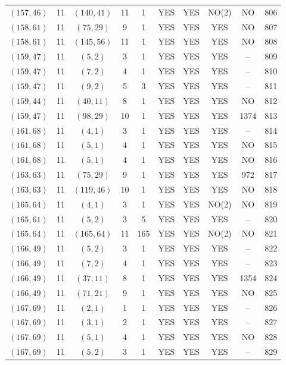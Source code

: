 \begin{longtable}{|c|c|c|c|c|c|c|c|c|c|}
$(157, 46)$ & 11 & $(140, 41)$ & 11 & 1 & YES & YES & NO(2) & NO & 806\\
$(158, 61)$ & 11 & $(75, 29)$ & 9 & 1 & YES & YES & YES & NO & 807\\
$(158, 61)$ & 11 & $(145, 56)$ & 11 & 1 & YES & YES & YES & NO & 808\\
$(159, 47)$ & 11 & $(5, 2)$ & 3 & 1 & YES & YES & YES & -- & 809\\
$(159, 47)$ & 11 & $(7, 2)$ & 4 & 1 & YES & YES & YES & -- & 810\\
$(159, 47)$ & 11 & $(9, 2)$ & 5 & 3 & YES & YES & YES & -- & 811\\
$(159, 44)$ & 11 & $(40, 11)$ & 8 & 1 & YES & YES & YES & NO & 812\\
$(159, 47)$ & 11 & $(98, 29)$ & 10 & 1 & YES & YES & YES & 1374 & 813\\
$(161, 68)$ & 11 & $(4, 1)$ & 3 & 1 & YES & YES & YES & -- & 814\\
$(161, 68)$ & 11 & $(5, 1)$ & 4 & 1 & YES & YES & YES & NO & 815\\
$(161, 68)$ & 11 & $(5, 1)$ & 4 & 1 & YES & YES & YES & NO & 816\\
$(163, 63)$ & 11 & $(75, 29)$ & 9 & 1 & YES & YES & YES & 972 & 817\\
$(163, 63)$ & 11 & $(119, 46)$ & 10 & 1 & YES & YES & YES & NO & 818\\
$(165, 64)$ & 11 & $(4, 1)$ & 3 & 1 & YES & YES & NO(2) & NO & 819\\
$(165, 61)$ & 11 & $(5, 2)$ & 3 & 5 & YES & YES & YES & -- & 820\\
$(165, 64)$ & 11 & $(165, 64)$ & 11 & 165 & YES & YES & NO(2) & NO & 821\\
$(166, 49)$ & 11 & $(5, 2)$ & 3 & 1 & YES & YES & YES & -- & 822\\
$(166, 49)$ & 11 & $(7, 2)$ & 4 & 1 & YES & YES & YES & -- & 823\\
$(166, 49)$ & 11 & $(37, 11)$ & 8 & 1 & YES & YES & YES & 1354 & 824\\
$(166, 49)$ & 11 & $(71, 21)$ & 9 & 1 & YES & YES & YES & NO & 825\\
$(167, 69)$ & 11 & $(2, 1)$ & 1 & 1 & YES & YES & YES & -- & 826\\
$(167, 69)$ & 11 & $(3, 1)$ & 2 & 1 & YES & YES & YES & -- & 827\\
$(167, 69)$ & 11 & $(5, 1)$ & 4 & 1 & YES & YES & YES & NO & 828\\
$(167, 69)$ & 11 & $(5, 2)$ & 3 & 1 & YES & YES & YES & -- & 829\\

\end{longtable}

